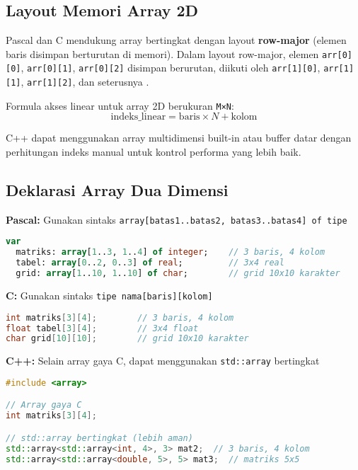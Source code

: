 \documentclass[../main.tex]{subfiles}
\begin{document}
\subsection{Layout Memori Array 2D}

Pascal dan C mendukung array bertingkat dengan layout \textbf{row-major} (elemen baris disimpan berturutan di memori). Dalam layout row-major, elemen \texttt{arr[0][0]}, \texttt{arr[0][1]}, \texttt{arr[0][2]} disimpan berurutan, diikuti oleh \texttt{arr[1][0]}, \texttt{arr[1][1]}, \texttt{arr[1][2]}, dan seterusnya \parencite{free-pascal-docs,cplusplus-multidimensional}.

Formula akses linear untuk array 2D berukuran \texttt{M×N}:
\[
\mathrm{indeks\_linear} = \mathrm{baris} \times N + \mathrm{kolom}
\]

C++ dapat menggunakan array multidimensi built-in atau buffer datar dengan perhitungan indeks manual untuk kontrol performa yang lebih baik.

\subsection{Deklarasi Array Dua Dimensi}

\textbf{Pascal:} Gunakan sintaks \texttt{array[batas1..batas2, batas3..batas4] of tipe}
\begin{lstlisting}[language=Pascal, caption={Deklarasi array 2D di Pascal}]
var
  matriks: array[1..3, 1..4] of integer;    // 3 baris, 4 kolom
  tabel: array[0..2, 0..3] of real;         // 3x4 real
  grid: array[1..10, 1..10] of char;        // grid 10x10 karakter
\end{lstlisting}

\textbf{C:} Gunakan sintaks \texttt{tipe nama[baris][kolom]}
\begin{lstlisting}[language=C, caption={Deklarasi array 2D di C}]
int matriks[3][4];        // 3 baris, 4 kolom
float tabel[3][4];        // 3x4 float
char grid[10][10];        // grid 10x10 karakter
\end{lstlisting}

\textbf{C++:} Selain array gaya C, dapat menggunakan \texttt{std::array} bertingkat
\begin{lstlisting}[language=C++, caption={Deklarasi array 2D di C++}]
#include <array>

// Array gaya C
int matriks[3][4];

// std::array bertingkat (lebih aman)
std::array<std::array<int, 4>, 3> mat2;  // 3 baris, 4 kolom
std::array<std::array<double, 5>, 5> mat3;  // matriks 5x5
\end{lstlisting}
\end{document}
